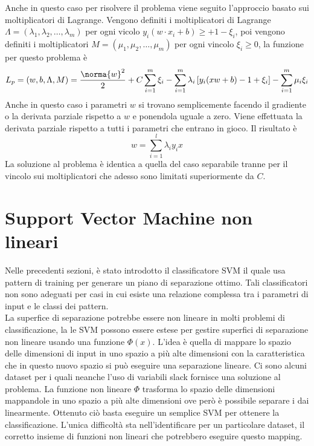 \noindent Anche in questo caso per risolvere il problema viene seguito l'approccio basato sui moltiplicatori di Lagrange. Vengono definiti i moltiplicatori di Lagrange $\Lambda =(\lambda_1, \lambda_2, \dots, \lambda_m)$ per ogni vicolo $y_i (w \cdot x_i + b) \geq +1 - \xi_i$, poi vengono definiti i moltiplicatori $M= (\mu_1, \mu_2, \dots, \mu_m )$ per ogni vincolo $\xi_i \geq 0$, la funzione per questo problema è
\begin{equation}
L_p = (w,b,\Lambda, M)  =  \frac{\norma{w}^2}{2} + C \sum_{i=1}^m \xi_i - \sum_{i=1}^m \lambda_i \left[ y_i (xw + b) - 1 + \xi_i \right] - \sum_{i=1}^m \mu_i \xi_i
\end{equation}
Anche in questo caso i parametri $w$ si trovano semplicemente facendo il gradiente o la derivata parziale rispetto a $w$ e ponendola uguale a zero. Viene effettuata la derivata parziale rispetto a tutti i parametri che entrano in gioco. Il risultato è
\begin{equation}
w =  \sum_{i=1}^l \lambda_i y_i x 
\end{equation}
La soluzione al problema è identica a quella del caso separabile tranne per il vincolo sui moltiplicatori che adesso sono limitati superiormente da $C$. 

\section{Support Vector Machine non lineari}
Nelle precedenti sezioni, è stato introdotto il classificatore SVM il quale usa pattern di training per generare un piano di separazione ottimo. Tali classificatori non sono adeguati per casi in cui esiste una relazione complessa tra i parametri di input e le classi dei pattern. \\

\noindent La superfice di separazione potrebbe essere non lineare in molti problemi di classificazione, la le SVM possono essere estese per gestire superfici di separazione non lineare usando una funzione $\Phi(x)$. L'idea è quella di mappare lo spazio delle dimensioni di input in uno spazio a più alte dimensioni con la caratteristica che in questo nuovo spazio si può eseguire una separazione lineare. Ci sono alcuni dataset per i quali neanche l'uso di variabili slack fornisce una soluzione al problema. La funzione non lineare $\Phi$ trasforma lo spazio delle dimensioni mappandole in uno spazio a più alte dimensioni ove però è possibile separare i dai linearmente. Ottenuto ciò basta eseguire un semplice SVM per ottenere la classificazione. L'unica difficoltà sta nell'identificare per un particolare dataset, il corretto insieme di funzioni non lineari che potrebbero eseguire questo mapping.\\

